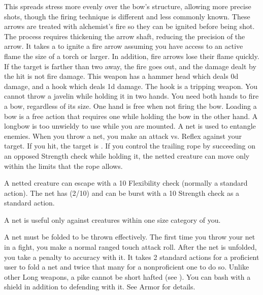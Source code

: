         This spreads stress more evenly over the bow's structure, allowing more precise shots, though the firing technique is different and less commonly known.
         These arrows are treated with alchemist's fire so they can be ignited before being shot.
        The process requires thickening the arrow shaft, reducing the precision of the arrow.
        It takes a  to ignite a fire arrow assuming you have access to an active flame the size of a torch or larger.
        In addition, fire arrows lose their flame quickly.
        If the target is farther than two  away, the fire goes out, and the damage dealt by the hit is not fire damage.
         This weapon has a hammer head which deals \plus0d damage, and a hook which deals \minus1d damage. The hook is a tripping weapon.
         You cannot throw a javelin while holding it in two hands.
         You need both hands to fire a bow, regardless of its size. One hand is free when not firing the bow. Loading a bow is a free action that requires one  while holding the bow in the other hand. A longbow is too unwieldy to use while you are mounted.
         A net is used to entangle enemies. When you throw a net, you make an attack vs. Reflex against your target. If you hit, the target is \slowed. If you control the trailing rope by succeeding on an opposed Strength check while holding it, the netted creature can move only within the limits that the rope allows.
        \par A netted creature can escape with a  10 Flexibility check (normally a standard action). The net has (2/10) and can be burst with a  10 Strength check as a standard action.
        \par A net is useful only against creatures within one size category of you.
        \par A net must be folded to be thrown effectively. The first time you throw your net in a fight, you make a normal ranged touch attack roll. After the net is unfolded, you take a  penalty to accuracy with it. It takes 2 standard actions for a proficient user to fold a net and twice that many for a nonproficient one to do so.
         Unlike other Long weapons, a pike cannot be short hafted (see ).
         You can bash with a shield in addition to defending with it. See Armor for details.
